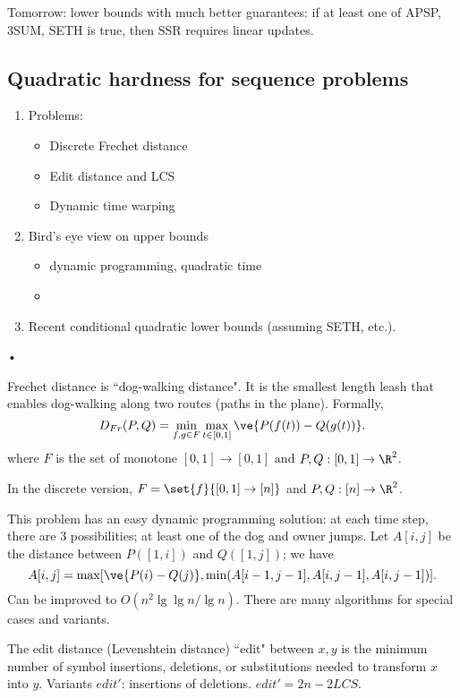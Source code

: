 Tomorrow: lower bounds with much better guarantees: if at least one of APSP, 3SUM, SETH is true, then SSR requires linear updates.


\subsection{Quadratic hardness for sequence problems}

\begin{enumerate}
\item
Problems:
\begin{itemize}
\item
Discrete Frechet distance
\item
Edit distance and LCS
\item
Dynamic time warping
\end{itemize}
\item
Bird's eye view on upper bounds
\begin{itemize}
\item
dynamic programming, quadratic time
\item
\end{itemize}
\item
Recent conditional quadratic lower bounds (assuming SETH, etc.).
\end{enumerate}•

Frechet distance is ``dog-walking distance".  It is the smallest length leash that enables dog-walking along two routes (paths in the plane).
Formally,
\[
D_{Fr}(P,Q) = \min_{f,g\in F}\max_{t\in [0,1]} \ve{P(f(t))-Q(g(t))}.
\]
where $F$ is the set of monotone $[0,1]\to [0,1]$ and $P,Q:[0,1]\to \R^2$. 

In the discrete version, $F=\set{f}{[0,1]\to [n]}$ and $P,Q:[n]\to \R^2$.

This problem has an easy dynamic programming solution: at each time step, there are 3 possibilities; at least one of the dog and owner jumps. Let $A[i,j]$ be the distance between $P([1,i])$ and $Q([1,j])$; we have 
\[
A[i,j]=\max[\ve{P(i)-Q(j)},\min(A[i-1,j-1],A[i,j-1],A[i,j-1])].
\]
Can be improved to $O(n^2\lg\lg n/\lg n)$.
There are many algorithms for special cases and variants. 

\begin{df}
The edit distance (Levenshtein distance) ``edit" between $x,y$ is the minimum number of symbol insertions, deletions, or substitutions needed to transform $x$ into $y$. Variants $edit'$: insertions of deletions. $edit'=2n - 2LCS$.
\end{df}


